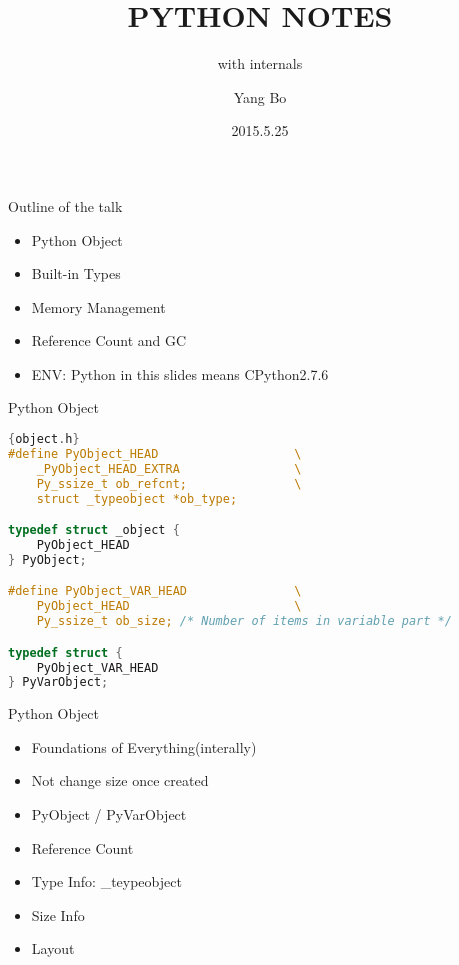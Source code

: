 \documentclass[xcolor=svgnames]{beamer}
\title{PYTHON NOTES}
\subtitle{with internals}
\author{Yang Bo}
\institute[Admaster]{
    RDBJ \\
    Admaster
}
\date{2015.5.25}
\begin{document}
\begin{frame}[plain]
  \titlepage
\end{frame}
\begin{frame}{Outline of the talk} 
 
\begin{itemize} 
  \item Python Object
  \item Built-in Types 
  \item Memory Management
  \item Reference Count and GC
  \item ENV: Python in this slides means CPython2.7.6
\end{itemize} 
 
\end{frame} 

\begin{frame}[fragile]{Python Object}
    \begin{lstlisting}[language=C]{object.h}
#define PyObject_HEAD                   \
    _PyObject_HEAD_EXTRA                \
    Py_ssize_t ob_refcnt;               \
    struct _typeobject *ob_type;

typedef struct _object {
    PyObject_HEAD
} PyObject;

#define PyObject_VAR_HEAD               \
    PyObject_HEAD                       \
    Py_ssize_t ob_size; /* Number of items in variable part */

typedef struct {
    PyObject_VAR_HEAD
} PyVarObject;
\end{lstlisting} 
\end{frame}

\begin{frame}{Python Object}
  \begin{itemize}
    \item Foundations of Everything(interally)
    \item Not change size once created
    \item PyObject / PyVarObject
    \item Reference Count
    \item Type Info: \_teypeobject
    \item Size Info
    \item Layout
  \end{itemize}
\end{frame}
\end{document}
